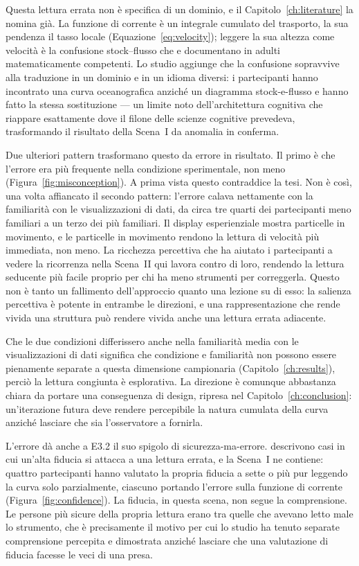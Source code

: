 Questa lettura errata non è specifica di un dominio, e il Capitolo~\ref{ch:literature} la nomina già. La funzione di corrente è un integrale cumulato del trasporto, la sua pendenza il tasso locale (Equazione~\ref{eq:velocity}); leggere la sua altezza come velocità è la confusione stock--flusso che \textcite{sterman2008} e \textcite{cronin2009} documentano in adulti matematicamente competenti. Lo studio aggiunge che la confusione sopravvive alla traduzione in un dominio e in un idioma diversi: i partecipanti hanno incontrato una curva oceanografica anziché un diagramma stock-e-flusso e hanno fatto la stessa sostituzione --- un limite noto dell'architettura cognitiva che riappare esattamente dove il filone delle scienze cognitive prevedeva, trasformando il risultato della Scena~I da anomalia in conferma.

Due ulteriori pattern trasformano questo da errore in risultato. Il primo è che l'errore era più frequente nella condizione sperimentale, non meno (Figura~\ref{fig:misconception}). A prima vista questo contraddice la tesi. Non è così, una volta affiancato il secondo pattern: l'errore calava nettamente con la familiarità con le visualizzazioni di dati, da circa tre quarti dei partecipanti meno familiari a un terzo dei più familiari. Il display esperienziale mostra particelle in movimento, e le particelle in movimento rendono la lettura di velocità più immediata, non meno. La ricchezza percettiva che ha aiutato i partecipanti a vedere la ricorrenza nella Scena~II qui lavora contro di loro, rendendo la lettura seducente più facile proprio per chi ha meno strumenti per correggerla. Questo non è tanto un fallimento dell'approccio quanto una lezione su di esso: la salienza percettiva è potente in entrambe le direzioni, e una rappresentazione che rende vivida una struttura può rendere vivida anche una lettura errata adiacente.

Che le due condizioni differissero anche nella familiarità media con le visualizzazioni di dati significa che condizione e familiarità non possono essere pienamente separate a questa dimensione campionaria (Capitolo~\ref{ch:results}), perciò la lettura congiunta è esplorativa. La direzione è comunque abbastanza chiara da portare una conseguenza di design, ripresa nel Capitolo~\ref{ch:conclusion}: un'iterazione futura deve rendere percepibile la natura cumulata della curva anziché lasciare che sia l'osservatore a fornirla.

L'errore dà anche a E3.2 il suo spigolo di sicurezza-ma-errore. \textcite{fischer2020} descrivono casi in cui un'alta fiducia si attacca a una lettura errata, e la Scena~I ne contiene: quattro partecipanti hanno valutato la propria fiducia a sette o più pur leggendo la curva solo parzialmente, ciascuno portando l'errore sulla funzione di corrente (Figura~\ref{fig:confidence}). La fiducia, in questa scena, non segue la comprensione. Le persone più sicure della propria lettura erano tra quelle che avevano letto male lo strumento, che è precisamente il motivo per cui lo studio ha tenuto separate comprensione percepita e dimostrata anziché lasciare che una valutazione di fiducia facesse le veci di una presa.

